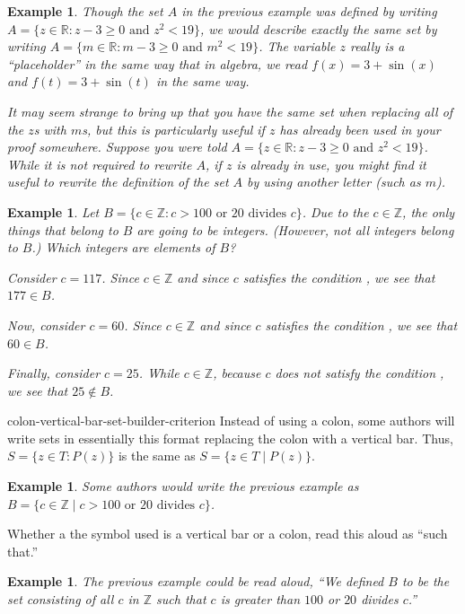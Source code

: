 \documentclass{book}
\newcounter{ekcounter}%
\theoremstyle{ekimcustom}
\newtheorem{example}[ekcounter]{Example}
\begin{document}
\begin{example}
Though the set $A$ in the previous example was defined by writing $A = \{z \in \mathbb{R} : z-3 \geq 0 \text{ and } z^2 < 19\}$, we would describe exactly the same set by writing $A = \{m \in \mathbb{R} : m-3 \geq 0 \text{ and } m^2 < 19\}$. The variable $z$ really is a ``placeholder'' in the same way that in algebra, we read $f(x)=3+\sin(x)$ and $f(t)=3+\sin(t)$ in the same way.

It may seem strange to bring up that you have the same set when replacing all of the $z$s with $m$s, but this is particularly useful if $z$ has already been used in your proof somewhere. Suppose you were told $A = \{z \in \mathbb{R} : z-3 \geq 0 \text{ and } z^2 < 19\}$. While it is not required to rewrite $A$, if $z$ is already in use, you might find it useful to rewrite the definition of the set $A$ by using another letter (such as $m$).
\end{example}
\begin{example}
Let $B = \{c \in \mathbb{Z} : c > 100 \text{ or } 20 \text{ divides } c\}$. Due to the $c \in \mathbb{Z}$, the only things that belong to $B$ are going to be integers. (However, not all integers belong to $B$.) Which integers are elements of $B$?

Consider $c=117$. Since $c \in \mathbb{Z}$ and since $c$ satisfies the condition , we see that $177 \in B$.

Now, consider $c=60$. Since $c \in \mathbb{Z}$ and since $c$ satisfies the condition , we see that $60 \in B$.

Finally, consider $c=25$. While $c \in \mathbb{Z}$, because $c$ does not satisfy the condition , we see that $25 \not\in B$.
\end{example}

\begin{bremark}{}{colon-vertical-bar-set-builder-criterion}
Instead of using a colon, some authors will write sets in essentially this format replacing the colon with a vertical bar. Thus, $S=\{z \in T : P(z)\}$ is the same as $S=\{z \in T \mid P(z)\}$.
\end{bremark}
\begin{example}
Some authors would write the previous example as $B = \{c \in \mathbb{Z} \mid c > 100 \text{ or } 20 \text{ divides } c\}$.
\end{example}
Whether a the symbol used is a vertical bar or a colon, read this aloud as ``such that.''
\begin{example}
The previous example could be read aloud, ``We defined $B$ to be the set consisting of all $c$ in $\mathbb{Z}$ such that $c$ is greater than $100$ or $20$ divides $c$.''
\end{example}
\end{document}
